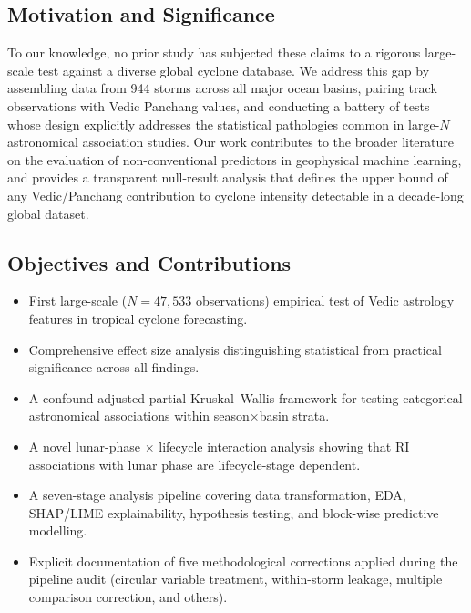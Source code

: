\documentclass[12pt,a4paper]{article}
\begin{document}
\subsection{Motivation and Significance}

To our knowledge, no prior study has subjected these claims to a rigorous
large-scale test against a diverse global cyclone database. We address this
gap by assembling data from 944 storms across all major ocean basins, pairing
track observations with Vedic Panchang values, and conducting a battery of
tests whose design explicitly addresses the statistical pathologies common in
large-$N$ astronomical association studies. Our work contributes to the
broader literature on the evaluation of non-conventional predictors in
geophysical machine learning, and provides a transparent null-result analysis
that defines the upper bound of any Vedic/Panchang contribution to cyclone
intensity detectable in a decade-long global dataset.

\subsection{Objectives and Contributions}

\begin{itemize}[noitemsep]
  \item First large-scale ($N = 47{,}533$ observations) empirical test of Vedic
        astrology features in tropical cyclone forecasting.
  \item Comprehensive effect size analysis distinguishing statistical from
        practical significance across all findings.
  \item A confound-adjusted partial Kruskal--Wallis framework for testing
        categorical astronomical associations within season$\times$basin strata.
  \item A novel lunar-phase $\times$ lifecycle interaction analysis showing that
        RI associations with lunar phase are lifecycle-stage dependent.
  \item A seven-stage analysis pipeline covering data transformation, EDA,
        SHAP/LIME explainability, hypothesis testing, and block-wise predictive
        modelling.
  \item Explicit documentation of five methodological corrections applied during
        the pipeline audit (circular variable treatment, within-storm leakage,
        multiple comparison correction, and others).
\end{itemize}
\end{document}
